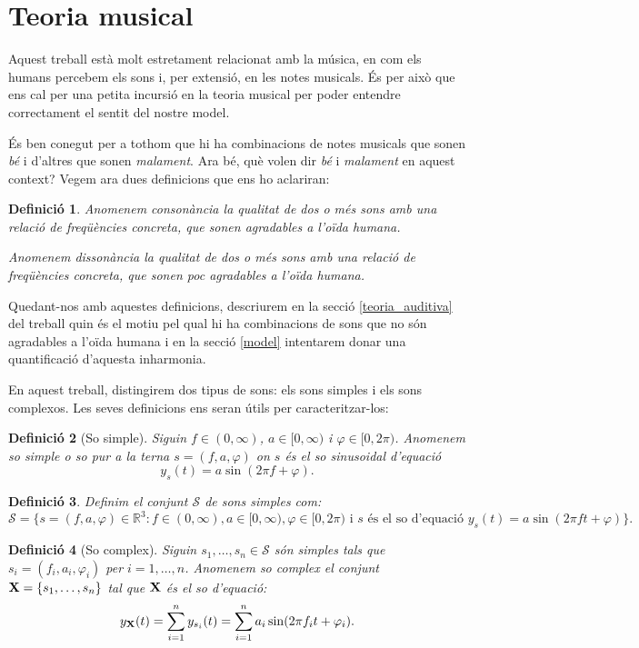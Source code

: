 \documentclass{article}
\theoremstyle{math}
\newtheorem{definition}{Definició}[section]
\newcommand{\0}{\ensuremath{\vb{0}}}
\newcommand{\X}{\ensuremath{\vb{X}}}
\newcommand{\RR}{\ensuremath{\mathbb{R}}} %
\begin{document}
\section{Teoria musical}
Aquest treball està molt estretament relacionat amb la música, en com els humans percebem els sons i, per extensió, en les notes musicals. És per això que ens cal per una petita incursió en la teoria musical per poder entendre correctament el sentit del nostre model.\par
És ben conegut per a tothom que hi ha combinacions de notes musicals que sonen \textit{bé} i d'altres que sonen \textit{malament}. Ara bé, què volen dir \textit{bé} i \textit{malament} en aquest context? Vegem ara dues definicions que ens ho aclariran:
\begin{definition}
Anomenem \textit{consonància} la qualitat de dos o més sons amb una relació de freqüències concreta, que sonen agradables a l'oïda humana.\par
Anomenem \textit{dissonància} la qualitat de dos o més sons amb una relació de freqüències concreta, que sonen poc agradables a l'oïda humana.
\end{definition}
Quedant-nos amb aquestes definicions, descriurem en la secció \ref{teoria_auditiva} del treball quin és el motiu pel qual hi ha combinacions de sons que no són agradables a l'oïda humana i en la secció \ref{model} intentarem donar una quantificació d'aquesta inharmonia.\par
En aquest treball, distingirem dos tipus de sons: els sons simples i els sons complexos. Les seves definicions ens seran útils per caracteritzar-los:
\begin{definition}[So simple]
Siguin $f\in(0,\infty)$, $a\in[0,\infty)$ i $\varphi\in[0,2\pi)$. Anomenem \textit{so simple} o \textit{so pur} a la terna $s=(f, a, \varphi)$ on $s$ és el so sinusoidal d'equació $$y_s(t)=a\sin(2\pi f+\varphi).$$
\end{definition}
\begin{definition}
    Definim el conjunt $\mathcal{S}$ de sons simples com: $$\mathcal{S}=\{s=(f,a,\varphi)\in\RR^3:f\in(0,\infty),a\in[0,\infty),\varphi\in[0,2\pi)\text{ i $s$ és el so d'equació }y_s(t)=a\sin(2\pi ft+\varphi)\}.$$
\end{definition}
\begin{definition}[So complex]\label{so_complex}
Siguin $s_1,\ldots,s_n\in\mathcal{S}$ són simples tals que $s_i=(f_i,a_i,\varphi_i)$ per $i=1,\ldots,n$. Anomenem \textit{so complex} el conjunt $\X=\{s_1,\ldots,s_n\}$ tal que $\X$ és el so d'equació: $$y_{\X}(t)=\sum_{i=1}^ny_{s_i}(t)=\sum_{i=1}^na_i\sin(2\pi f_it+\varphi_i).$$
\end{definition}
\end{document}

